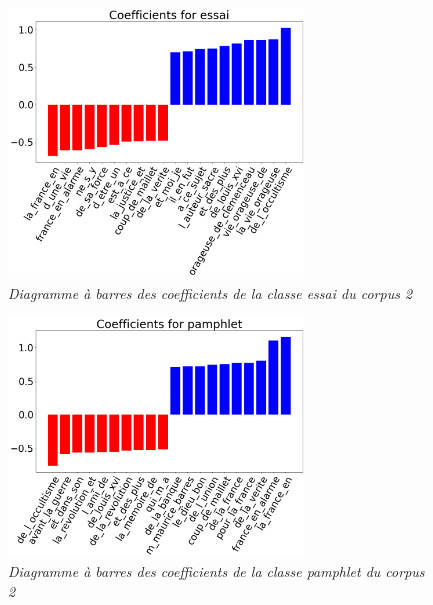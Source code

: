 \begin{figure}[H]
\centering %
\includegraphics[width=0.70\textwidth]{img/coefs-corpus2-essai.png}
\caption{\textit{Diagramme à barres des coefficients de la classe essai du corpus 2}}
\label{'fig:coefs-corpus2-essai'}
\end{figure}

\begin{figure}[H]
\centering %
\includegraphics[width=0.70\textwidth]{img/coefs-corpus2-pamphlet.png}
\caption{\textit{Diagramme à barres des coefficients de la classe pamphlet du corpus 2}}
\label{'fig:coefs-corpus2-pamphlet'}
\end{figure}

